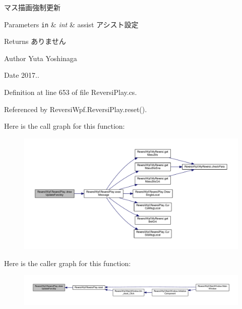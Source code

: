 マス描画強制更新 


\begin{DoxyParams}[1]{Parameters}
\mbox{\tt in}  & {\em int} & assist アシスト設定 \\
\hline
\end{DoxyParams}
\begin{DoxyReturn}{Returns}
ありません 
\end{DoxyReturn}
\begin{DoxyAuthor}{Author}
Yuta Yoshinaga 
\end{DoxyAuthor}
\begin{DoxyDate}{Date}
2017.. 
\end{DoxyDate}


Definition at line 653 of file Reversi\+Play.\+cs.



Referenced by Reversi\+Wpf.\+Reversi\+Play.\+reset().

Here is the call graph for this function\+:
\nopagebreak
\begin{figure}[H]
\begin{center}
\leavevmode
\includegraphics[width=350pt]{class_reversi_wpf_1_1_reversi_play_a0324e804add5c651915266f0254eb26f_cgraph}
\end{center}
\end{figure}
Here is the caller graph for this function\+:
\nopagebreak
\begin{figure}[H]
\begin{center}
\leavevmode
\includegraphics[width=350pt]{class_reversi_wpf_1_1_reversi_play_a0324e804add5c651915266f0254eb26f_icgraph}
\end{center}
\end{figure}
\mbox{\label{class_reversi_wpf_1_1_reversi_play_aa9c1ae9fc1af06e7e73f9db980cf0cfa}} 
